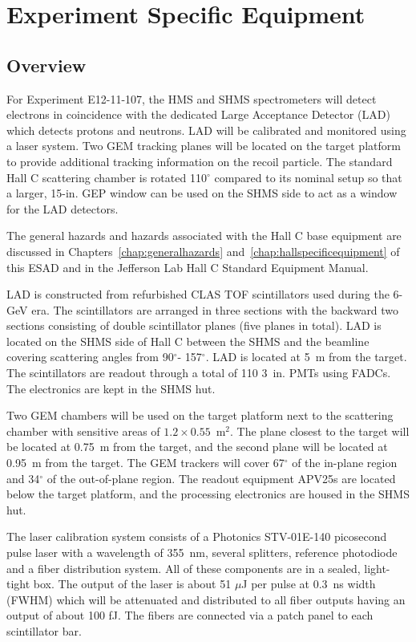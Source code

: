 \chapter{Experiment Specific Equipment}
\label{chap:expspecific}



\section{Overview}
For Experiment E12-11-107, the HMS and SHMS spectrometers will detect electrons in coincidence with the dedicated Large Acceptance Detector (LAD) which detects protons and neutrons. LAD will be calibrated and monitored using a laser system. Two GEM tracking planes will be located on the target platform to provide additional tracking information on the recoil particle. The standard Hall C scattering chamber is rotated 110$^{\circ}$ compared to its nominal setup so that a larger, 15-in. GEP window can be used on the SHMS side to act as a window for the LAD detectors. 

The general hazards and hazards associated with the Hall C base
equipment are discussed in Chapters~\ref{chap:generalhazards}
and~\ref{chap:hallspecificequipment} of this ESAD and in the Jefferson
Lab Hall C Standard Equipment Manual.%

LAD is constructed from refurbished CLAS TOF scintillators used during the 6-GeV era. The scintillators are arranged in three sections with the backward two sections consisting of double scintillator planes (five planes in total). LAD is located on the SHMS side of Hall C between the SHMS and the beamline covering scattering angles from 90$^{\circ}$- 157$^{\circ}$. LAD is located at 5~m from the target. The scintillators are readout through a total of 110 3~in. PMTs using FADCs. The electronics are kept in the SHMS hut. 

Two GEM chambers will be used on the target platform next to the scattering chamber with sensitive areas of $1.2\times 0.55$~m$^2$. The plane closest to the target will be located at 0.75~m from the target, and the second plane will be located at 0.95~m from the target. The GEM trackers will cover 67$^{\circ}$ of the in-plane region and 34$^{\circ}$ of the out-of-plane region. The readout equipment APV25s are located below the target platform, and the processing electronics are housed in the SHMS hut. 

The laser calibration system consists of a Photonics STV-01E-140 picosecond pulse laser with a wavelength of 355~nm, several splitters, reference photodiode and a fiber distribution system. All of these components are in
a sealed, light-tight box. The output of the laser is about 51 $\mu$J per pulse at
0.3~ns width (FWHM) which will be attenuated and distributed to all fiber
outputs having an output of about 100 fJ. The fibers are connected via a patch panel to each scintillator bar.

